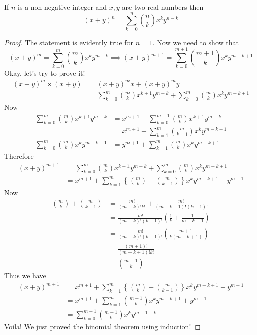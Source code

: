 \documentclass[11pt,numbers=noenddot,svgnames,dvipsnames]{scrartcl}
\begin{document}
\begin{example}
    If $n$ is a non-negative integer and $x, y$ are two real numbers then 
    \[
        (x + y)^{n} = \sum_{k=0}^{n} \binom{n}{k} x^{k}y^{n-k}
    \]
\end{example}
\begin{proof}
    The statement is evidently true for $n=1$. Now we need to show that 
    \[
        (x + y)^{m} = \sum_{k=0}^{m} \binom{m}{k} x^{k} y^{m - k}
        \implies (x + y)^{m + 1} = \sum_{k=0}^{m + 1} \binom{m+1}{k} x^{k} y^{m - k + 1}
    \]
    Okay, let's try to prove it!
    \begin{align*}
        (x + y)^{m} \times (x + y) 
        &= (x + y)^{m} x + (x + y)^{m} y \\
        &= \sum_{k=0}^{m} \binom{m}{k} x^{k + 1} y^{m - k} + \sum_{k=0}^{m} \binom{m}{k} x^{k} y^{m - k + 1}
    \end{align*}
    Now 
    \begin{align*}
        \sum_{k=0}^{m} \binom{m}{k} x^{k + 1} y^{m - k} &= x^{m + 1} + 
        \sum_{k=0}^{m-1} \binom{m}{k} x^{k+1} y^{m - k} \\
        &= x^{m+1} + \sum_{k=1}^{m} \binom{m}{k-1} x^{k} y^{m - k + 1} \\ 
        \sum_{k=0}^{m} \binom{m}{k} x^{k} y^{m - k + 1} &= y^{m + 1} + 
        \sum_{k = 1}^{m} \binom{m}{k} x^{k} y^{m - k + 1}
    \end{align*}
    Therefore 
    \begin{align*}
        (x + y)^{m + 1} &= \sum_{k=0}^{m} \binom{m}{k} x^{k + 1} y^{m - k} + \sum_{k=0}^{m} \binom{m}{k} x^{k} y^{m - k + 1} \\
        &= x^{m + 1} + \sum_{k=1}^{m} \left\{\binom{m}{k} + \binom{m}{k-1} \right\} x^{k} y^{m - k + 1} + y^{m + 1}
    \end{align*}
    Now 
    \begin{align*}
        \binom{m}{k} + \binom{m}{k - 1} &= \frac{m!}{(m - k)!k!} + \frac{m!}{(m - k + 1)!(k - 1)!} \\
                                        &= \frac{m!}{(m - k)!(k - 1)!} \left(\frac{1}{k} + \frac{1}{m - k + 1}\right) \\
                                        &= \frac{m!}{(m - k)!(k - 1)!}\left(\frac{m + 1}{k(m - k + 1)}\right) \\
                                        &= \frac{(m + 1)!}{(m - k + 1)! k!} \\
                                        &= \binom{m + 1}{k}
    \end{align*}
    Thus we have 
    \begin{align*}
        (x + y)^{m + 1} 
        &= x^{m + 1} + \sum_{k=1}^{m} \left\{\binom{m}{k} + \binom{m}{k-1} \right\} x^{k} y^{m - k + 1} + y^{m + 1} \\
        &= x^{m + 1} + \sum_{k=1}^{m} \binom{m + 1}{k} x^{k} y^{m - k + 1} + y^{m + 1} \\
        &= \sum_{k = 0}^{m + 1} \binom{m + 1}{k} x^{k} y^{m + 1 - k}
    \end{align*}
    Voila! We just proved the binomial theorem using induction!
\end{proof}
\end{document}
